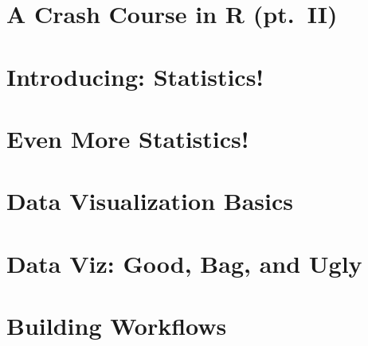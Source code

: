 \documentclass[
]{book}
\begin{document}
\hypertarget{part-a-crash-course-in-r-pt.-ii}{%
\part{A Crash Course in R (pt.~II)}\label{part-a-crash-course-in-r-pt.-ii}}

\hypertarget{part-introducing-statistics}{%
\part{Introducing: Statistics!}\label{part-introducing-statistics}}

\hypertarget{part-even-more-statistics}{%
\part{Even More Statistics!}\label{part-even-more-statistics}}

\hypertarget{part-data-visualization-basics}{%
\part{Data Visualization Basics}\label{part-data-visualization-basics}}

\hypertarget{part-data-viz-good-bag-and-ugly}{%
\part{Data Viz: Good, Bag, and Ugly}\label{part-data-viz-good-bag-and-ugly}}

\hypertarget{part-building-workflows}{%
\part{Building Workflows}\label{part-building-workflows}}
\end{document}
